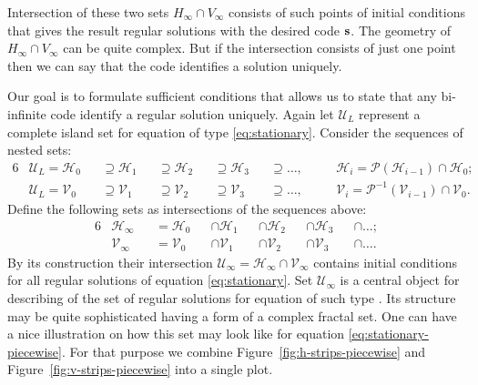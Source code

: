 Intersection of these two sets $H_{\infty} \cap V_{\infty}$ consists of such points of initial conditions that gives the result regular solutions with the desired code $\vb{s}$.
The geometry of $H_{\infty} \cap V_{\infty}$ can be quite complex.
But if the intersection consists of just one point then we can say that the code identifies a solution uniquely.

Our goal is to formulate sufficient conditions that allows us to state that any bi-infinite code identify a regular solution uniquely.
Again let $\mathscr{U}_L$ represent a complete island set for equation of type \eqref{eq:stationary}.
Consider the sequences of nested sets:
\begin{alignat*}{6}
	& \mathscr{U}_L = \mathscr{H}_0 && \supseteq \mathscr{H}_1 && \supseteq \mathscr{H}_2 && \supseteq \mathscr{H}_3 && \supseteq \dots, \quad && \mathscr{H}_i = \mathcal{P}(\mathscr{H}_{i-1}) \cap \mathscr{H}_0; \\
	& \mathscr{U}_L = \mathscr{V}_0 && \supseteq \mathscr{V}_1 && \supseteq \mathscr{V}_2 && \supseteq \mathscr{V}_3 && \supseteq \dots, \quad && \mathscr{V}_i = \mathcal{P}^{-1}(\mathscr{V}_{i-1}) \cap \mathscr{V}_0.
\end{alignat*} 
Define the following sets as intersections of the sequences above:
\begin{alignat*}{6}
	& \mathscr{H}_{\infty} && = \mathscr{H}_0 && \cap \mathscr{H}_1 && \cap \mathscr{H}_2 && \cap \mathscr{H}_3 && \cap \dots; \\
	& \mathscr{V}_{\infty} && = \mathscr{V}_0 && \cap \mathscr{V}_1 && \cap \mathscr{V}_2 && \cap \mathscr{V}_3 && \cap \dots.
\end{alignat*}
By its construction their intersection $\mathscr{U}_{\infty} = \mathscr{H}_{\infty} \cap \mathscr{V}_{\infty}$ contains initial conditions for all regular solutions of equation \eqref{eq:stationary}.
Set $\mathscr{U}_{\infty}$ is a central object for describing of the set of regular solutions for equation of such type \cite{AlfimovAvramenko, AlfimovLebedev, AlfimovKizinZezyulin}.
Its structure may be quite sophisticated having a form of a complex fractal set.
One can have a nice illustration on how this set may look like for equation \eqref{eq:stationary-piecewise}.
For that purpose we combine Figure~\ref{fig:h-strips-piecewise} and Figure~\ref{fig:v-strips-piecewise} into a single plot.

